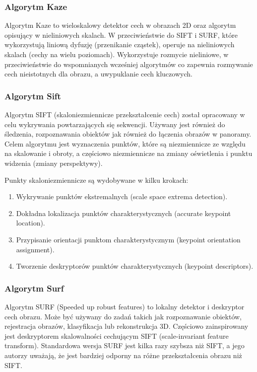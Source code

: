 \documentclass[12pt, notitlepage]{article}
\begin{document}
\subsubsection{Algorytm Kaze}

Algorytm Kaze to wieloskalowy detektor cech w obrazach 2D oraz algorytm opisujący w nieliniowych skalach. W przeciwieństwie do SIFT i SURF, które wykorzystują liniową dyfuzję (przenikanie cząstek), operuje na nieliniowych skalach (cechy na wielu poziomach). Wykorzystuje rozmycie nieliniowe, w przeciwieństwie do wspomnianych wcześniej algorytmów co zapewnia rozmywanie cech nieistotnych dla obrazu, a uwypuklanie cech kluczowych.

\subsubsection{Algorytm Sift}

Algorytm SIFT (skaloniezmiennicze przekształcenie cech) został opracowany w celu wykrywania powtarzających się sekwencji. Używany jest również do śledzenia, rozpoznawania obiektów jak również do łączenia obrazów w panoramy. Celem algorytmu jest wyznaczenia punktów, które są niezmiennicze ze względu na skalowanie i obroty, a częściowo niezmiennicze na zmiany oświetlenia i punktu widzenia (zmiany perspektywy).

Punkty skaloniezmiennicze są wydobywane w kilku krokach:
\begin{enumerate}
    \item Wykrywanie punktów ekstremalnych (scale space extrema detection).
    \item Dokładna lokalizacja punktów charakterystycznych (accurate keypoint location).
    \item Przypisanie orientacji punktom charakterystycznym (keypoint orientation assignment).
    \item Tworzenie deskryptorów punktów charakterystycznych (keypoint descriptors).
\end{enumerate}

\subsubsection{Algorytm Surf}

Algorytm SURF (Speeded up robust features) to lokalny detektor i deskryptor cech obrazu. Może być używany do zadań takich jak rozpoznawanie obiektów, rejestracja obrazów, klasyfikacja lub rekonstrukcja 3D. Częściowo zainspirowany jest deskryptorem skalowalności cechującym SIFT (scale-invariant feature transform). Standardowa wersja SURF jest kilka razy szybsza niż SIFT, a jego autorzy uważają, że jest bardziej odporny na różne przekształcenia obrazu niż SIFT.
\end{document}
